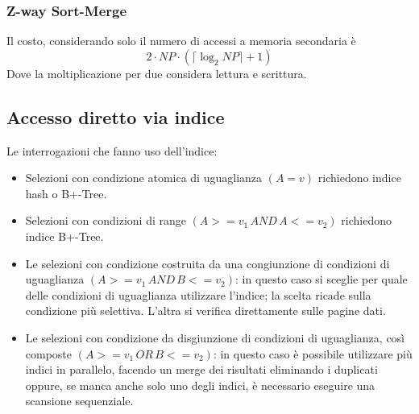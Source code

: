 \documentclass[oneside,a4paper,11pt]{book}
\theoremstyle{italicstyle}
\theoremstyle{normStyle}
\begin{document}
\subsubsection{Z-way Sort-Merge}
\begin{figure}[H]
  \centering
\end{figure}
Il costo, considerando solo il numero di accessi a memoria secondaria è 
\[
  2 \cdot NP \cdot \left( \lceil \log_2 NP\rceil + 1\right)
\]
Dove la moltiplicazione per due considera lettura e scrittura.
\subsection{Accesso diretto via indice}
Le interrogazioni che fanno uso dell'indice:
\begin{itemize}
  \item Selezioni con condizione atomica di uguaglianza $(A = v)$ richiedono indice hash o
  B+-Tree.
  \item Selezioni con condizioni di range $(A >=v_1\, AND \, A <=v_2)$ richiedono indice B+-Tree.
  \item Le selezioni con condizione costruita da una congiunzione di condizioni di uguaglianza $(A >=v_1\, AND \, B <=v_2)$:
  in questo caso si sceglie per quale delle condizioni di uguaglianza utilizzare l'indice; la 
  scelta ricade sulla condizione più selettiva. L'altra si verifica direttamente sulle pagine dati.
  \item Le selezioni con condizione da disgiunzione di condizioni di uguaglianza, così composte $(A >=v_1\, OR \, B <=v_2)$:
  in questo caso è possibile utilizzare più indici in parallelo, facendo un merge dei risultati eliminando i duplicati oppure,
  se manca anche solo uno degli indici, è necessario eseguire una scansione sequenziale.
\end{itemize}
\end{document}
